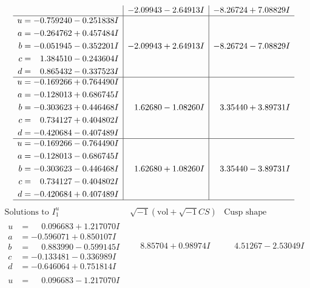 \documentclass[1p]{elsarticle_modified}
\theoremstyle{definition}
\newcommand{\I}{\sqrt{-1}}
\begin{document}
$$\begin{array}{c|c|c}
 & -2.09943 - 2.64913 I & -8.26724 + 7.08829 I \\ \hline\begin{aligned}
u &= -0.759240 - 0.251838 I \\
a &= -0.264762 + 0.457484 I \\
b &= -0.051945 - 0.352201 I \\
c &= \phantom{-}1.384510 - 0.243604 I \\
d &= \phantom{-}0.865432 - 0.337523 I\end{aligned}
 & -2.09943 + 2.64913 I & -8.26724 - 7.08829 I \\ \hline\begin{aligned}
u &= -0.169266 + 0.764490 I \\
a &= -0.128013 + 0.686745 I \\
b &= -0.303623 + 0.446468 I \\
c &= \phantom{-}0.734127 + 0.404802 I \\
d &= -0.420684 - 0.407489 I\end{aligned}
 & \phantom{-}1.62680 - 1.08260 I & \phantom{-}3.35440 + 3.89731 I \\ \hline\begin{aligned}
u &= -0.169266 - 0.764490 I \\
a &= -0.128013 - 0.686745 I \\
b &= -0.303623 - 0.446468 I \\
c &= \phantom{-}0.734127 - 0.404802 I \\
d &= -0.420684 + 0.407489 I\end{aligned}
 & \phantom{-}1.62680 + 1.08260 I & \phantom{-}3.35440 - 3.89731 I\\
 \hline 
 \end{array}$$\newpage$$\begin{array}{c|c|c}  
\text{Solutions to }I^u_{1}& \I (\text{vol} + \sqrt{-1}CS) & \text{Cusp shape}\\
 \hline 
\begin{aligned}
u &= \phantom{-}0.096683 + 1.217070 I \\
a &= -0.596071 + 0.850107 I \\
b &= \phantom{-}0.883990 - 0.599145 I \\
c &= -0.133481 - 0.336989 I \\
d &= -0.646064 + 0.751814 I\end{aligned}
 & \phantom{-}8.85704 + 0.98974 I & \phantom{-}4.51267 - 2.53049 I \\ \hline\begin{aligned}
u &= \phantom{-}0.096683 - 1.217070 I \\

\end{aligned}
\end{array}$$
\end{document}
